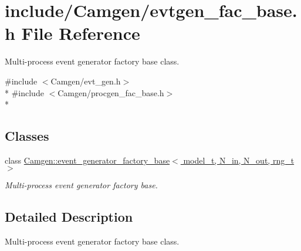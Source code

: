 \hypertarget{a00636}{}\section{include/\+Camgen/evtgen\+\_\+fac\+\_\+base.h File Reference}
\label{a00636}


Multi-\/process event generator factory base class.  


{\ttfamily \#include $<$Camgen/evt\+\_\+gen.\+h$>$}\\*
{\ttfamily \#include $<$Camgen/procgen\+\_\+fac\+\_\+base.\+h$>$}\\*
\subsection*{Classes}
\begin{DoxyCompactItemize}
\item 
class \hyperlink{a00214}{Camgen\+::event\+\_\+generator\+\_\+factory\+\_\+base$<$ model\+\_\+t, N\+\_\+in, N\+\_\+out, rng\+\_\+t $>$}
\begin{DoxyCompactList}\small\item\em Multi-\/process event generator factory base. \end{DoxyCompactList}\end{DoxyCompactItemize}


\subsection{Detailed Description}
Multi-\/process event generator factory base class. 


